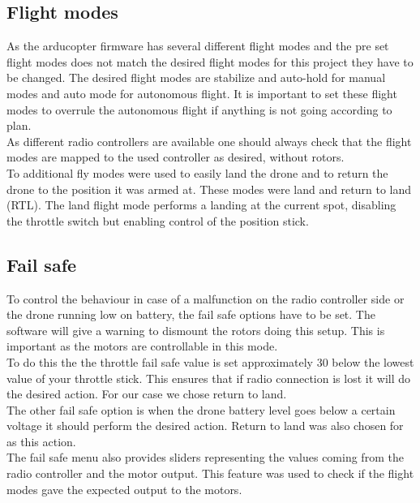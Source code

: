 \subsection*{Flight modes}
As the arducopter firmware has several different flight modes and the pre set flight modes does not match the desired flight modes for this project they have to be changed. The desired flight modes are stabilize and auto-hold for manual modes and auto mode for autonomous flight. It is important to set these flight modes to overrule the autonomous flight if anything is not going according to plan.\\
As different radio controllers are available one should always check that the flight modes are mapped to the used controller as desired, without rotors.\\
To additional fly modes were used to easily land the drone and to return the drone to the position it was armed at. These modes were land and return to land (RTL). The land flight mode performs a landing at the current spot, disabling the throttle switch but enabling control of the position stick.\\

\subsection*{Fail safe}
To control the behaviour in case of a malfunction on the radio controller side or the drone running low on battery, the fail safe options have to be set. The software will give a warning to dismount the rotors doing this setup. This is important as the motors are controllable in this mode.\\
To do this the the throttle fail safe value is set approximately 30 below the lowest value of your throttle stick. This ensures that if radio connection is lost it will do the desired action. For our case we chose return to land.\\
The other fail safe option is when the drone battery level goes below a certain voltage it should perform the desired action. Return to land was also chosen for as this action.\\
The fail safe menu also provides sliders representing the values coming from the radio controller and the motor output. This feature was used to check if the flight modes gave the expected output to the motors.

